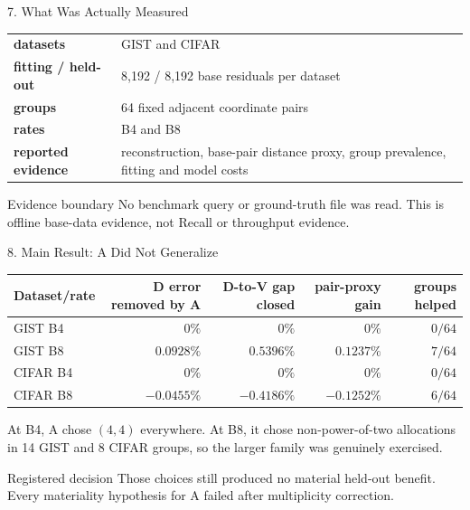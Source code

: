 \documentclass[aspectratio=169]{beamer}
\begin{document}
\begin{frame}{7. What Was Actually Measured}
\begin{tabularx}{\textwidth}{>{\bfseries}p{} X}
datasets & GIST and CIFAR\\
fitting / held-out & 8,192 / 8,192 base residuals per dataset\\
groups & 64 fixed adjacent coordinate pairs\\
rates & B4 and B8\\
reported evidence & reconstruction, base-pair distance proxy, group prevalence, fitting and model costs\\
\end{tabularx}
\begin{alertblock}{Evidence boundary}
No benchmark query or ground-truth file was read. This is offline base-data evidence, not Recall or throughput evidence.
\end{alertblock}
\end{frame}

\begin{frame}{8. Main Result: A Did Not Generalize}
\scriptsize
\begin{tabular}{lrrrr}
\toprule
Dataset/rate & D error removed by A & D-to-V gap closed & pair-proxy gain & groups helped\\
\midrule
GIST B4  & $0\%$       & $0\%$        & $0\%$        & $0/64$\\
GIST B8  & $0.0928\%$  & $0.5396\%$   & $0.1237\%$   & $7/64$\\
CIFAR B4 & $0\%$       & $0\%$        & $0\%$        & $0/64$\\
CIFAR B8 & $-0.0455\%$ & $-0.4186\%$  & $-0.1252\%$  & $6/64$\\
\bottomrule
\end{tabular}
\normalsize\par
\medskip
At B4, A chose $(4,4)$ everywhere. At B8, it chose non-power-of-two allocations in 14 GIST and 8 CIFAR groups, so the larger family was genuinely exercised.
\begin{alertblock}{Registered decision}
Those choices still produced no material held-out benefit. Every materiality hypothesis for A failed after multiplicity correction.
\end{alertblock}
\end{frame}
\end{document}
